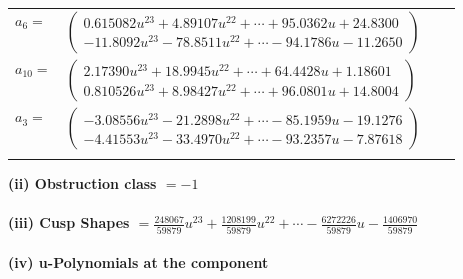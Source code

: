 \documentclass[1p]{elsarticle_modified}
\theoremstyle{definition}
\begin{document}
\begin{tabular}{m{7pt} m{180pt} m{7pt} m{180pt} }
\flushright $a_{6}=$&$\begin{pmatrix}0.615082 u^{23}+4.89107 u^{22}+\cdots+95.0362 u+24.8300\\-11.8092 u^{23}-78.8511 u^{22}+\cdots-94.1786 u-11.2650\end{pmatrix}$ \\
\flushright $a_{10}=$&$\begin{pmatrix}2.17390 u^{23}+18.9945 u^{22}+\cdots+64.4428 u+1.18601\\0.810526 u^{23}+8.98427 u^{22}+\cdots+96.0801 u+14.8004\end{pmatrix}$ \\
\flushright $a_{3}=$&$\begin{pmatrix}-3.08556 u^{23}-21.2898 u^{22}+\cdots-85.1959 u-19.1276\\-4.41553 u^{23}-33.4970 u^{22}+\cdots-93.2357 u-7.87618\end{pmatrix}$\\&\end{tabular}
\flushleft \textbf{(ii) Obstruction class $= -1$}\\~\\
\flushleft \textbf{(iii) Cusp Shapes $= \frac{248067}{59879} u^{23}+\frac{1208199}{59879} u^{22}+\cdots-\frac{6272226}{59879} u-\frac{1406970}{59879}$}\\~\\
\newpage\renewcommand{\arraystretch}{1}
\flushleft \textbf{(iv) u-Polynomials at the component}\newline \\
\end{document}
